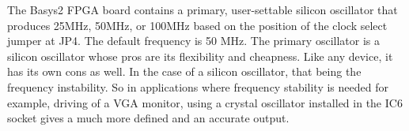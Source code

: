 \noindent
The Basys2 FPGA board contains a primary, user-settable silicon oscillator that produces 25MHz, 50MHz, or 100MHz based on the position of the clock select jumper at JP4. The default frequency is 50 MHz. The primary oscillator is a silicon oscillator whose pros are its flexibility and cheapness. Like any device, it has its own cons as well. In the case of a  silicon oscillator, that being the frequency instability. So in applications where frequency stability is needed for example, driving of a VGA monitor, using a crystal oscillator installed in the IC6 socket gives a much more defined and an accurate output. 